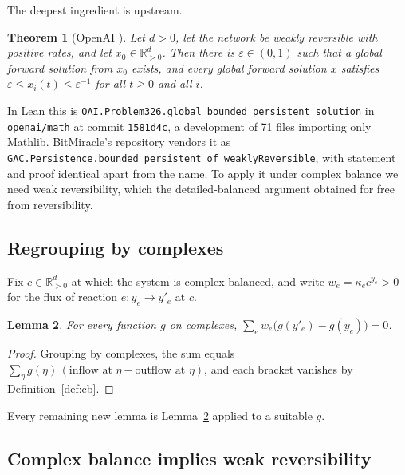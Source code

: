 \documentclass[11pt]{article}
\newcommand{\Rpos}{\mathbb{R}^{d}_{>0}}
\newcommand{\lean}[1]{\texttt{#1}}
\theoremstyle{plain}
\newtheorem{theorem}{Theorem}[section]
\newtheorem{lemma}[theorem]{Lemma}
\theoremstyle{definition}
\theoremstyle{remark}
\begin{document}
The deepest ingredient is upstream.

\begin{theorem}[OpenAI \cite{OpenAIMath}]\label{thm:openai}
Let $d > 0$, let the network be weakly reversible with positive rates, and let $x_0 \in \Rpos$. Then there is $\varepsilon \in (0,1)$ such that a global forward solution from $x_0$ exists, and every global forward solution $x$ satisfies $\varepsilon \le x_i(t) \le \varepsilon^{-1}$ for all $t \ge 0$ and all $i$.
\end{theorem}

\noindent In Lean this is \lean{OAI.\allowbreak Problem326.\allowbreak global\_\allowbreak bounded\_\allowbreak persistent\_\allowbreak solution} in \lean{openai/math} at commit \lean{1581d4c}, a development of 71 files importing only Mathlib. BitMiracle's repository vendors it as \lean{GAC.\allowbreak Persistence.\allowbreak bounded\_\allowbreak persistent\_\allowbreak of\_\allowbreak weaklyReversible}, with statement and proof identical apart from the name. To apply it under complex balance we need weak reversibility, which the detailed-balanced argument obtained for free from reversibility.

\subsection{Regrouping by complexes}

Fix $c \in \Rpos$ at which the system is complex balanced, and write $w_e = \kappa_e c^{y_e} > 0$ for the flux of reaction $e\colon y_e \to y'_e$ at $c$.

\begin{lemma}\label{lem:regroup}
For every function $g$ on complexes, $\displaystyle\sum_{e} w_e \bigl(g(y'_e) - g(y_e)\bigr) = 0$.
\end{lemma}

\begin{proof}
Grouping by complexes, the sum equals $\sum_\eta g(\eta)\,(\text{inflow at }\eta - \text{outflow at }\eta)$, and each bracket vanishes by Definition~\ref{def:cb}.
\end{proof}

\noindent Every remaining new lemma is Lemma~\ref{lem:regroup} applied to a suitable $g$.

\subsection{Complex balance implies weak reversibility}
\end{document}
